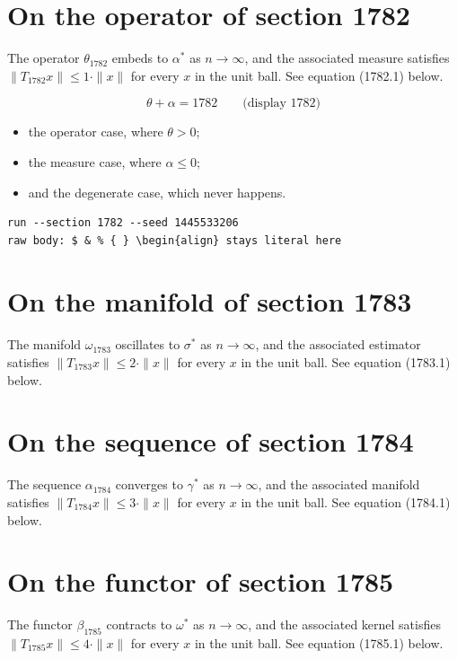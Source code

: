 \documentclass{article}
\begin{document}
\section{On the operator of section 1782}
The operator $\theta_{1782}$ embeds to $\alpha^{*}$ as $n \to \infty$,
and the associated measure satisfies $\|T_{1782} x\| \leq 1 \cdot \|x\|$
for every $x$ in the unit ball. See equation (1782.1) below.

$$
\theta + \alpha = 1782 \qquad \text{(display 1782)}
$$

\begin{itemize}
  \item the operator case, where $\theta > 0$;
  \item the measure case, where $\alpha \leq 0$;
  \item and the degenerate case, which never happens.
\end{itemize}

\begin{verbatim}
run --section 1782 --seed 1445533206
raw body: $ & % { } \begin{align} stays literal here
\end{verbatim}

\section{On the manifold of section 1783}
The manifold $\omega_{1783}$ oscillates to $\sigma^{*}$ as $n \to \infty$,
and the associated estimator satisfies $\|T_{1783} x\| \leq 2 \cdot \|x\|$
for every $x$ in the unit ball. See equation (1783.1) below.

\section{On the sequence of section 1784}
The sequence $\alpha_{1784}$ converges to $\gamma^{*}$ as $n \to \infty$,
and the associated manifold satisfies $\|T_{1784} x\| \leq 3 \cdot \|x\|$
for every $x$ in the unit ball. See equation (1784.1) below.

\section{On the functor of section 1785}
The functor $\beta_{1785}$ contracts to $\omega^{*}$ as $n \to \infty$,
and the associated kernel satisfies $\|T_{1785} x\| \leq 4 \cdot \|x\|$
for every $x$ in the unit ball. See equation (1785.1) below.
\end{document}
